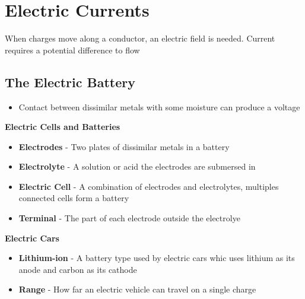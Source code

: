 \section{Electric Currents}
When charges move along a conductor, an electric field is needed. Current requires a potential difference to flow

\subsection{The Electric Battery}
\begin{itemize}
    \item Contact between dissimilar metals with some moisture can produce a voltage
\end{itemize}

\textbf{Electric Cells and Batteries}
\begin{itemize}
    \item \textbf{Electrodes} - Two plates of dissimilar metals in a battery
    \item \textbf{Electrolyte} - A solution or acid the electrodes are submersed in
    \item \textbf{Electric Cell} - A combination of electrodes and electrolytes, multiples connected cells form a battery
    \item \textbf{Terminal} - The part of each electrode outside the electrolye
\end{itemize}

\textbf{Electric Cars}
\begin{itemize}
    \item \textbf{Lithium-ion} -  A battery type used by electric cars whic uses lithium as its anode and carbon as its cathode
    \item \textbf{Range} - How far an electric vehicle can travel on a single charge
\end{itemize}

